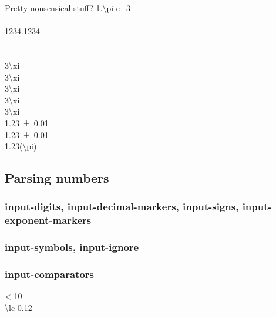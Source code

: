 \documentclass{article}
\begin{document}
Pretty nonsensical stuff?
\num{1.\pi e+3}\\
\def\dig{1234}\\
\num{\dig.\dig}\\
\def\odd{\xi}\\
\def\odder{\odd}\\
\num[input-symbols=\xi]{3\xi}\\
\num[input-symbols=\xi]{3\odd}\\
\num[input-symbols=\odd, input-protect-tokens=\odd]{3\odd}\\
\num[input-symbols=\odd, input-protect-tokens=\odd]{3\odder}\\
\num[input-symbols=\odder, input-protect-tokens=\odder]{3\odder}\\

\num{1.23(1)}\\
\num{1.23\pm0.01}\\
\num{1.23(\pi)}\\

\subsection{Parsing numbers}

\subsubsection{input-digits, input-decimal-markers, input-signs, input-exponent-markers}

\subsubsection{input-symbols, input-ignore}
\subsubsection{input-comparators}

\num{< 10} \\
\num{\le 0.12}\\
\end{document}
